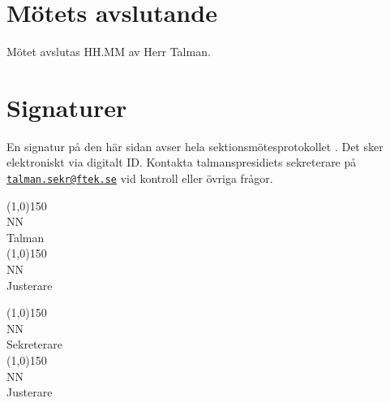 \documentclass{sektionsmote}
\begin{document}
\section{Mötets avslutande}
Mötet avslutas HH.MM av Herr Talman.

\clearpage
\section*{Signaturer}
En signatur på den här sidan avser hela sektionsmötesprotokollet \themote. Det sker elektroniskt via digitalt ID. Kontakta talmanspresidiets sekreterare på \href{mailto:talman.sekr@ftek.se}{\texttt{talman.sekr@ftek.se}} vid kontroll eller övriga frågor. 

\vspace{4cm}

\begin{minipage}{0.45\textwidth}
\begin{center}
\line(1,0){150}\\
\footnotesize NN\\ %
Talman\\[3cm]
\line(1,0){150}\\
\footnotesize NN\\ %
Justerare
\end{center}
\end{minipage}
\begin{minipage}{0.45\textwidth}
\begin{center}
\line(1,0){150}\\
\footnotesize NN\\ %
Sekreterare\\[3cm]
\line(1,0){150}\\
\footnotesize NN\\ %
Justerare
\end{center}
\end{minipage}

\clearpage
\begin{bilagor}
%
\end{bilagor}
\end{document}
